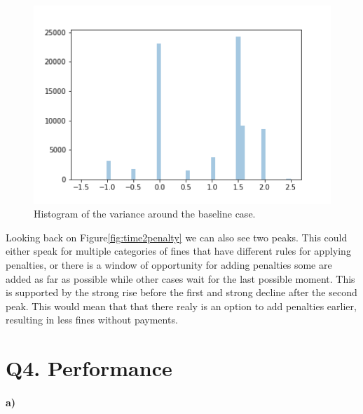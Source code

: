 \documentclass[12pt]{report}
\begin{document}

\begin{figure}[H]
  \centering
  \includegraphics[width=\textwidth]{figures/baselineVar.png}
  \caption{Histogram of the variance around the baseline case.}
  \label{fig:baselineVar}
\end{figure}

Looking back on Figure\ref{fig:time2penalty} we can also see two peaks. This could either speak for multiple categories of fines that have different rules for applying penalties, or there is a window of opportunity for adding penalties some are added as far as possible while other cases wait for the last possible moment. This is supported by the strong rise before the first and strong decline after the second peak. This would mean that that there realy is an option to add penalties earlier, resulting in less fines without payments.

\section{Q4. Performance}

\paragraph{\textbf{a)}}
\end{document}
